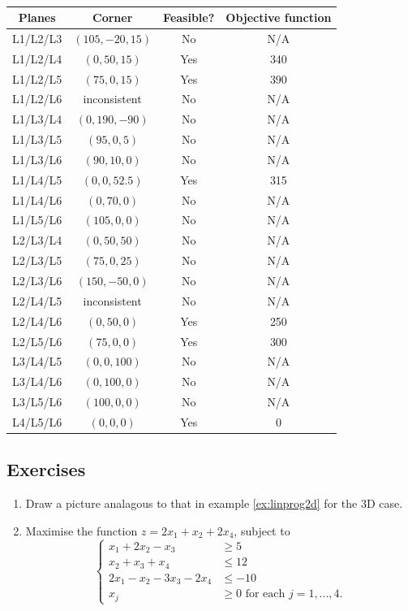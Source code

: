 \documentclass[a4paper,leqno]{article}
\numberwithin{equation}{section}
\theoremstyle{definition}
\theoremstyle{remark}
\begin{document}
\begin{table}
  \centering
  \begin{tabular}{cccc}
    \textbf{Planes} & \textbf{Corner} & \textbf{Feasible?} & \textbf{Objective function}\\\hline
    L1/L2/L3 & $ (105, -20, 15)$ & No & N/A\\
    L1/L2/L4 & $ (0,50,15) $ & Yes & 340 \\
    L1/L2/L5 & $ (75,0,15) $ & Yes & 390 \\
    L1/L2/L6 & inconsistent & No & N/A\\
    L1/L3/L4 & $ (0,190,-90) $ & No & N/A\\
    L1/L3/L5 & $ (95,0,5) $ & No & N/A \\
    L1/L3/L6 & $ (90,10,0) $ & No & N/A \\
    L1/L4/L5 & $ (0,0,52.5) $ & Yes & 315 \\
    L1/L4/L6 & $ (0,70,0) $ & No & N/A \\
    L1/L5/L6 & $ (105,0,0) $ & No & N/A \\
    L2/L3/L4 & $ (0,50,50) $ & No & N/A \\
    L2/L3/L5 & $ (75,0,25) $ & No & N/A \\
    L2/L3/L6 & $ (150,-50,0) $ & No & N/A\\
    L2/L4/L5 & inconsistent & No & N/A\\
    L2/L4/L6 & $ (0,50,0) $ & Yes & 250 \\
    L2/L5/L6 & $ (75,0,0) $ & Yes & 300 \\
    L3/L4/L5 & $ (0,0,100) $ & No & N/A \\
    L3/L4/L6 & $ (0,100,0) $ & No & N/A \\
    L3/L5/L6 & $ (100,0,0) $ & No & N/A \\
    L4/L5/L6 & $ (0,0,0) $ & Yes & 0
  \end{tabular}
  \caption{\label{tab:linprog3d}}
\end{table}

\subsection*{Exercises}
\begin{enumerate}
  \item Draw a picture analagous to that in example \ref{ex:linprog2d} for the 3D case.
  \item Maximise the function $ z = 2x_1 + x_2 + 2x_4 $, subject to
        \begin{displaymath}
          \begin{cases}
             x_1 + 2x_2 - x_3 &\geq 5\\
             x_2 + x_3 + x_4 &\leq 12\\
             2x_1 - x_2 - 3x_3 - 2x_4 &\leq -10\\
             x_j &\geq 0 \text{ for each } j = 1,...,4.
          \end{cases}
        \end{displaymath}
\end{enumerate}
\end{document}
